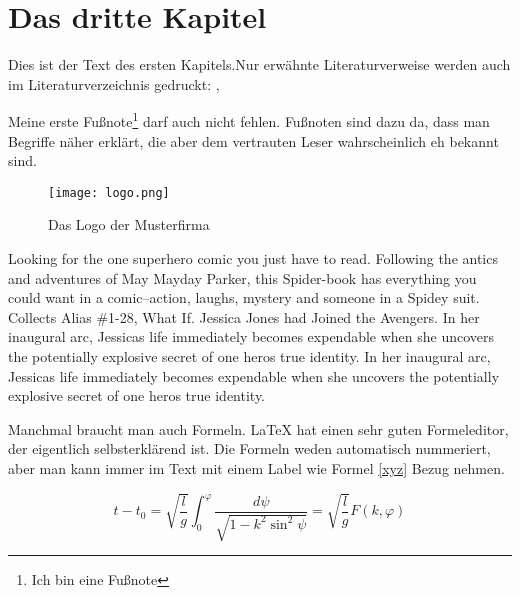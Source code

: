 
\chapter{Das dritte Kapitel}
Dies ist der Text des ersten Kapitels.Nur erwähnte Literaturverweise werden auch im Literaturverzeichnis gedruckt: \cite[S.12 ff]{baumgartner:2002}, \cite[S.1-3]{dreyfus:1980}

Meine erste Fußnote\footnote{Ich bin eine Fußnote} darf auch nicht fehlen. Fußnoten sind dazu da, dass man Begriffe näher erklärt, die aber dem vertrauten Leser wahrscheinlich eh bekannt sind. 

\begin{figure}[h]
\centering
\texttt{[image: logo.png]}
\caption{Das Logo der Musterfirma\footnotemark}
\end{figure}



Looking for the one superhero comic you just have to read. Following the antics and adventures of May Mayday Parker, this Spider-book has everything you could want in a comic--action, laughs, mystery and someone in a Spidey suit. Collects Alias \#1-28, What If. Jessica Jones had Joined the Avengers. In her inaugural arc, Jessicas life immediately becomes expendable when she uncovers the potentially explosive secret of one heros true identity. In her inaugural arc, Jessicas life immediately becomes expendable when she uncovers the potentially explosive secret of one heros true identity.

Manchmal braucht man auch Formeln. LaTeX hat einen sehr guten Formeleditor, der eigentlich selbsterklärend ist. Die Formeln weden automatisch nummeriert, aber man kann immer im Text mit einem Label wie Formel \ref{xyz} Bezug nehmen.

\begin{equation}
t-t_{0}=\sqrt{\frac{l}{g}}\int_{0}^{\varphi}{\frac{d\psi}{\sqrt{1-k^{2}\sin^{2} {\psi}}}} = \sqrt{\frac{l}{g}} F(k,\varphi)
\end{equation}

